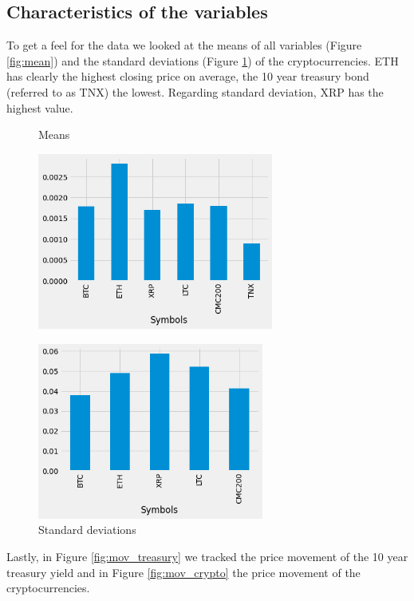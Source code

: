 \subsection{Characteristics of the variables}
To get a feel for the data we looked at the means of all variables (Figure \ref{fig:mean}) and the standard deviations (Figure \ref{fig:std}) of the cryptocurrencies. ETH has clearly the highest closing price on average, the 10 year treasury bond (referred to as TNX) the lowest. Regarding standard deviation, XRP has the highest value.


\begin{figure}
\centering
\begin{minipage}{.5\textwidth}
  \centering
  \caption{Means}
  \label{fig:mean}
  \includegraphics[height=5.8cm,keepaspectratio]{images/mean.png}
\end{minipage}%
\begin{minipage}{.5\textwidth}
  \centering
  \caption{Standard deviations}
  \label{fig:std}
  \includegraphics[height=5.8cm,keepaspectratio]{images/std.png}
\end{minipage}
\end{figure}

Lastly, in Figure \ref{fig:mov_treasury} we tracked the price movement of the 10 year treasury yield and in Figure \ref{fig:mov_crypto} the price movement of the cryptocurrencies.

